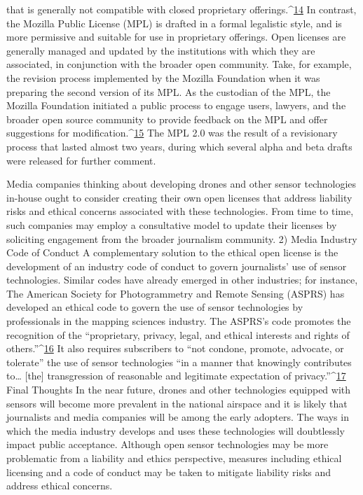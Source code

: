 that is generally not compatible with closed proprietary offerings.^{\href{#endnotes-cooper}{14}} In contrast,
the Mozilla Public License (MPL) is drafted in a formal legalistic style,
and is more permissive and suitable for use in proprietary offerings.
Open licenses are generally managed and updated by the institutions with
which they are associated, in conjunction with the broader open community.
Take, for example, the revision process implemented by the Mozilla
Foundation when it was preparing the second version of its MPL. As the
custodian of the MPL, the Mozilla Foundation initiated a public process to
engage users, lawyers, and the broader open source community to provide
feedback on the MPL and offer suggestions for modification.^{\href{#endnotes-cooper}{15}} The MPL 2.0
was the result of a revisionary process that lasted almost two years, during
which several alpha and beta drafts were released for further comment.

Media companies thinking about developing drones and other sensor
technologies in-house ought to consider creating their own open licenses
that address liability risks and ethical concerns associated with these technologies.
From time to time, such companies may employ a consultative
model to update their licenses by soliciting engagement from the broader
journalism community.
2) Media Industry Code of Conduct
A complementary solution to the ethical open license is the development of
an industry code of conduct to govern journalists' use of sensor technologies.
Similar codes have already emerged in other industries; for instance,
The American Society for Photogrammetry and Remote Sensing (ASPRS)
has developed an ethical code to govern the use of sensor technologies by
professionals in the mapping sciences industry. The ASPRS's code promotes
the recognition of the ``proprietary, privacy, legal, and ethical interests and
rights of others.''^{\href{#endnotes-cooper}{16}} It also requires subscribers to ``not condone, promote,
advocate, or tolerate'' the use of sensor technologies ``in a manner that
knowingly contributes to… [the] transgression of reasonable and legitimate
expectation of privacy.''^{\href{#endnotes-cooper}{17}}
Final Thoughts
In the near future, drones and other technologies equipped with sensors
will become more prevalent in the national airspace and it is likely that journalists
and media companies will be among the early adopters. The ways in
which the media industry develops and uses these technologies will doubtlessly
impact public acceptance. Although open sensor technologies may be
more problematic from a liability and ethics perspective, measures including
ethical licensing and a code of conduct may be taken to mitigate liability
risks and address ethical concerns.

